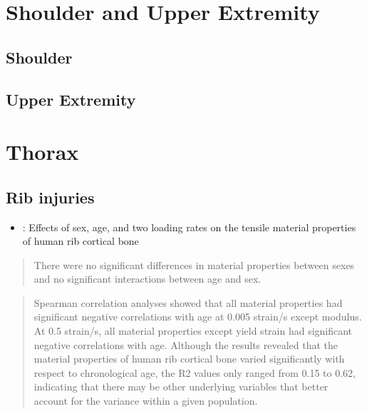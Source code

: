 \documentclass[]{book}
\providecommand{\tightlist}{%
  \setlength{\itemsep}{0pt}\setlength{\parskip}{0pt}}
\begin{document}
\hypertarget{shoulder-and-upper-extremity}{%
\chapter{Shoulder and Upper Extremity}\label{shoulder-and-upper-extremity}}

\hypertarget{shoulder}{%
\section{Shoulder}\label{shoulder}}

\hypertarget{upper-extremity}{%
\section{Upper Extremity}\label{upper-extremity}}

\hypertarget{thorax}{%
\chapter{Thorax}\label{thorax}}

\hypertarget{rib-injuries}{%
\section{Rib injuries}\label{rib-injuries}}

\begin{itemize}
\tightlist
\item
  \citet{Katzenberger2020}: Effects of sex, age, and two loading rates on the tensile material properties of human rib cortical bone
\end{itemize}

\begin{quote}
There were no significant differences in material properties between sexes and no significant interactions between age and sex.
\end{quote}

\begin{quote}
Spearman correlation analyses showed that all material properties had significant negative correlations with age at 0.005 strain/s except modulus. At 0.5 strain/s, all material properties except yield strain had significant negative correlations with age. Although the results revealed that the material properties of human rib cortical bone varied significantly with respect to chronological age, the R2 values only ranged from 0.15 to 0.62, indicating that there may be other underlying variables that better account for the variance within a given population.
\end{quote}
\end{document}
